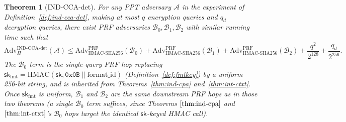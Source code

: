 \documentclass[11pt,a4paper]{article}
\newtheorem{theorem}{Theorem}[section]
\begin{document}
\begin{theorem}[IND-CCA-det]\label{thm:ind-cca}
For any PPT adversary $\mathcal{A}$ in the experiment of
Definition~\ref{def:ind-cca-det}, making at most $q$ encryption queries and
$q_d$ decryption queries, there exist
PRF adversaries $\mathcal{B}_0,\mathcal{B}_1,\mathcal{B}_2$ with similar
running time such that
\[
  \mathrm{Adv}^{\mathrm{IND\text{-}CCA\text{-}det}}_{\Pi}(\mathcal{A})
  \leq
  \mathrm{Adv}^{\mathrm{PRF}}_{\mathrm{HMAC\text{-}SHA256}}(\mathcal{B}_0)
  +
  \mathrm{Adv}^{\mathrm{PRF}}_{\mathrm{HMAC\text{-}SHA256}}(\mathcal{B}_1)
  +
  \mathrm{Adv}^{\mathrm{PRF}}_{\mathrm{HMAC\text{-}SHA256}}(\mathcal{B}_2)
  + \frac{q^2}{2^{128}}
  + \frac{q_d}{2^{256}}.
\]
The $\mathcal{B}_0$ term is the single-query PRF hop replacing
$\mathsf{sk}_{\mathrm{fmt}}=\mathrm{HMAC}(\mathsf{sk},\texttt{0x0B}\|\mathrm{format\_id})$
(Definition~\ref{def:fmtkey}) by a uniform 256-bit string, and is
inherited from Theorems~\ref{thm:ind-cpa} and~\ref{thm:int-ctxt}. Once
$\mathsf{sk}_{\mathrm{fmt}}$ is uniform, $\mathcal{B}_1$ and
$\mathcal{B}_2$ are the same downstream PRF hops as in those two
theorems (a single $\mathcal{B}_0$ term suffices, since Theorems
$\ref{thm:ind-cpa}$ and $\ref{thm:int-ctxt}$'s $\mathcal{B}_0$ hops
target the identical $\mathsf{sk}$-keyed HMAC call).
\end{theorem}
\end{document}
